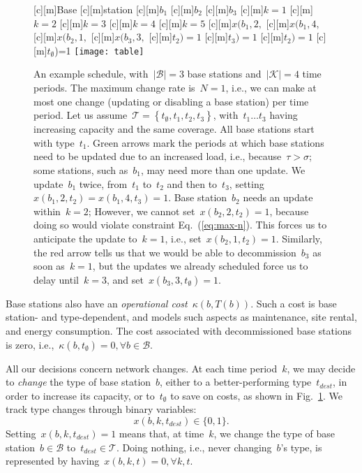 \documentclass[10pt,journal,cspaper,compsoc]{IEEEtran}
\newcommand{\Fig}[1]{Fig.~\ref{fig:#1}}
\newcommand{\Eq}[1]{Eq.~(\ref{eq:#1})}
\newcommand{\Bc}{\mathcal{B}}
\newcommand{\Kc}{\mathcal{K}}
\newcommand{\Tc}{\mathcal{T}}
\begin{document}
\begin{figure}[t!]
[c][m]{Base}
[c][m]{station}
[c][m]{$b_1$}
[c][m]{$b_2$}
[c][m]{$b_3$}
[c][m]{$k=1$}
[c][m]{$k=2$}
[c][m]{$k=3$}
[c][m]{$k=4$}
[c][m]{$k=5$}
[c][m]{\footnotesize{$x(b_1,2,$}}
[c][m]{\footnotesize{$x(b_1,4,$}}
[c][m]{\footnotesize{$x(b_2,1,$}}
[c][m]{\footnotesize{$x(b_3,3,$}}
[c][m]{\footnotesize{$t_2)=1$}}
[c][m]{\footnotesize{$t_3)=1$}}
[c][m]{\footnotesize{$t_2)=1$}}
[c][m]{\footnotesize{$t_\emptyset$)=1}}
\centering
	\texttt{[image: table]}
	\caption{
	An example schedule, with~$|\Bc|=3$ base stations and~$|\Kc|=4$ time periods. The maximum change rate is~$N=1$,
	i.e., we can make at most one change (updating or disabling a base station) per time period.
	Let us assume~$\Tc=\left\{t_\emptyset,t_1,t_2,t_3\right\}$, with~$t_1\dots t_3$ having increasing capacity and the
	same coverage. All base stations start with type~$t_1$.
	Green arrows mark the periods at which base stations need to be updated due to an increased load, i.e., because~$\tau>\sigma$;
	some stations, such as~$b_1$, may need more than one update.
	We update~$b_1$ twice, from~$t_1$ to~$t_2$ and then to~$t_3$, setting~$x(b_1,2,t_2)=x(b_1,4,t_3)=1$.
	Base station~$b_2$ needs an update within~$k=2$; However, we cannot set~$x(b_2,2,t_2)=1$, because doing so
	would violate constraint \Eq{max-n}. This forces us to anticipate the update to~$k=1$, i.e., set~$x(b_2,1,t_2)=1$. 
	Similarly, the red arrow tells us that we would be able to decommission~$b_3$ as soon as~$k=1$,
	but the updates we already scheduled force us to delay until~$k=3$, and set~$x(b_3,3,t_\emptyset)=1$.
	\label{fig:table}
	}
\end{figure}

Base stations also have an {\em operational cost}~$\kappa(b,T(b))$. Such a cost is base station- and type-dependent, and models such aspects as maintenance, site rental, and energy consumption.
The cost associated with decommissioned base stations is zero, i.e.,~$\kappa(b,t_\emptyset)=0, \forall b\in\Bc$.

All our decisions concern network changes.
At each time period~$k$, we may decide to {\em change} the type of base station~$b$, either to a better-performing
type~$t_{dest}$, in order to increase its capacity, or to~$t_\emptyset$ to save on costs, as shown in \Fig{table}.
We track type changes through binary variables:
\begin{equation}
\nonumber
x(b,k,t_{dest})\in\{0,1\}.
\end{equation}
Setting~$x(b,k,t_{dest})=1$ means that, at time~$k$, we change the type of base station~$b\in\Bc$ to~$t_{dest}\in\Tc$.
Doing nothing, i.e., never changing~$b$'s type, is represented by having~$x(b,k,t)=0,\forall k,t$.
\end{document}
